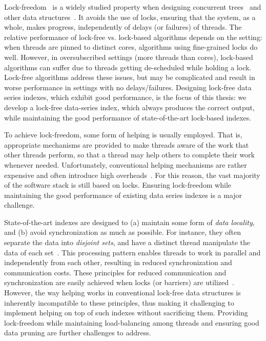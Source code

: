 Lock-freedom~\cite{HS08} is a widely studied property when designing
concurrent trees~\cite{EFRB10,EFHR14,FR2018,ABF+22} and other data structures~\cite{F04,HS08,FKR18}. 
It avoids the use of locks, ensuring that the system, as a whole, 
makes progress, independently of delays (or failures) of threads. 
The relative performance of lock-free vs. lock-based algorithms depends on the setting:
when threads are pinned to distinct cores, algorithms using fine-grained locks do well. However, in
oversubscribed settings (more threads than cores), lock-based algorithms can suffer due to threads
getting de-scheduled while holding a lock. Lock-free algorithms address these issues, but may be
complicated and result in worse performance in settings with no delays/failures.
Designing lock-free data series indexes, which exhibit good performance, is
the focus of this thesis: we develop a lock-free data-series index, which always
produces the correct output, while maintaining the good performance of state-of-the-art
lock-based indexes.

To achieve lock-freedom, some form of helping is usually employed. 
That is, appropriate mechanisms are provided to make threads aware 
of the work that other threads perform, so that a thread may help others to
complete their work whenever needed. 
Unfortunately, conventional helping mechanisms are rather expensive and often
introduce high overheads~\cite{F04,HS08,7515610,Williams2012CCI}.
For this reason, the vast majority of the software stack is still based on locks. 
Ensuring lock-freedom while maintaining the good performance of 
existing data series indexes is a major challenge. 

State-of-the-art indexes are designed to (a) maintain some form of {\em data locality},
and (b) avoid synchronization as much as possible.
For instance, they often separate the data into {\em disjoint sets}, and have a
distinct thread manipulate the data of each set~\cite{parisplus,PFP21-I,PFP21-II}.
This processing pattern enables threads to work in parallel and independently from each other,
resulting in reduced synchronization and communication costs.  
These principles for reduced communication and synchronization are easily achieved when locks 
(or barriers) are utilized~\cite{peng2018paris,peng2020messi,PFP21-I,PFP21-II}.
However, the way helping works in conventional lock-free data structures is inherently
incompatible to these principles, thus making it challenging to implement helping on top
of such indexes without sacrificing them. Providing lock-freedom while maintaining load-balancing
among threads and ensuring good data pruning are further challenges to address. 

